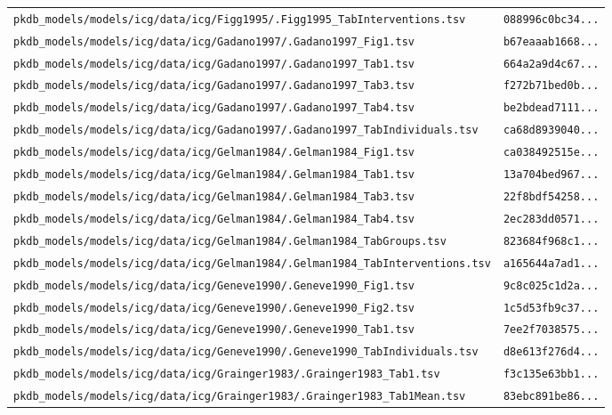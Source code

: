 \documentclass{article}
\begin{document}
\begin{longtable}{ll}
\texttt{pkdb\_models/models/icg/data/icg/Figg1995/.Figg1995\_TabInterventions.tsv} & \texttt{088996c0bc34...} \\
\texttt{pkdb\_models/models/icg/data/icg/Gadano1997/.Gadano1997\_Fig1.tsv} & \texttt{b67eaaab1668...} \\
\texttt{pkdb\_models/models/icg/data/icg/Gadano1997/.Gadano1997\_Tab1.tsv} & \texttt{664a2a9d4c67...} \\
\texttt{pkdb\_models/models/icg/data/icg/Gadano1997/.Gadano1997\_Tab3.tsv} & \texttt{f272b71bed0b...} \\
\texttt{pkdb\_models/models/icg/data/icg/Gadano1997/.Gadano1997\_Tab4.tsv} & \texttt{be2bdead7111...} \\
\texttt{pkdb\_models/models/icg/data/icg/Gadano1997/.Gadano1997\_TabIndividuals.tsv} & \texttt{ca68d8939040...} \\
\texttt{pkdb\_models/models/icg/data/icg/Gelman1984/.Gelman1984\_Fig1.tsv} & \texttt{ca038492515e...} \\
\texttt{pkdb\_models/models/icg/data/icg/Gelman1984/.Gelman1984\_Tab1.tsv} & \texttt{13a704bed967...} \\
\texttt{pkdb\_models/models/icg/data/icg/Gelman1984/.Gelman1984\_Tab3.tsv} & \texttt{22f8bdf54258...} \\
\texttt{pkdb\_models/models/icg/data/icg/Gelman1984/.Gelman1984\_Tab4.tsv} & \texttt{2ec283dd0571...} \\
\texttt{pkdb\_models/models/icg/data/icg/Gelman1984/.Gelman1984\_TabGroups.tsv} & \texttt{823684f968c1...} \\
\texttt{pkdb\_models/models/icg/data/icg/Gelman1984/.Gelman1984\_TabInterventions.tsv} & \texttt{a165644a7ad1...} \\
\texttt{pkdb\_models/models/icg/data/icg/Geneve1990/.Geneve1990\_Fig1.tsv} & \texttt{9c8c025c1d2a...} \\
\texttt{pkdb\_models/models/icg/data/icg/Geneve1990/.Geneve1990\_Fig2.tsv} & \texttt{1c5d53fb9c37...} \\
\texttt{pkdb\_models/models/icg/data/icg/Geneve1990/.Geneve1990\_Tab1.tsv} & \texttt{7ee2f7038575...} \\
\texttt{pkdb\_models/models/icg/data/icg/Geneve1990/.Geneve1990\_TabIndividuals.tsv} & \texttt{d8e613f276d4...} \\
\texttt{pkdb\_models/models/icg/data/icg/Grainger1983/.Grainger1983\_Tab1.tsv} & \texttt{f3c135e63bb1...} \\
\texttt{pkdb\_models/models/icg/data/icg/Grainger1983/.Grainger1983\_Tab1Mean.tsv} & \texttt{83ebc891be86...} \\

\end{longtable}
\end{document}
